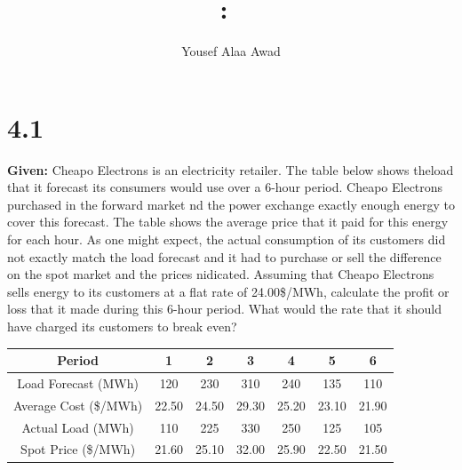\documentclass{article}
\title{
    \vspace{2in}
    \textmd{\textbf{\hmwkClass:\ \hmwkTitle}}\\
    \normalsize\vspace{0.1in}
    \vspace{3in}
}
\author{Yousef Alaa Awad}
\begin{document}
\maketitle
\pagebreak

\section{4.1}
\textbf{Given:} Cheapo Electrons is an electricity retailer. The table below shows theload that it forecast its consumers would use over a 6-hour period. Cheapo Electrons purchased in the forward market nd the power exchange exactly enough energy to cover this forecast. The table shows the average price that it paid for this energy for each hour. As one might expect, the actual consumption of its customers did not exactly match the load forecast and it had to purchase or sell the difference on the spot market and the prices nidicated. Assuming that Cheapo Electrons sells energy to its customers at a flat rate of 24.00\$/MWh, calculate the profit or loss that it made during this 6-hour period. What would the rate that it should have charged its customers to break even?
\begin{center}
	\begin{tabular}{||c|c|c|c|c|c|c||}
		\hline
		Period                & 1     & 2     & 3       & 4     & 5     & 6     \\
		\hline \hline
		Load Forecast (MWh)   & 120   & 230   & 310     & 240   & 135   & 110   \\
		\hline
		Average Cost (\$/MWh) & 22.50 & 24.50 & 29.30   & 25.20 & 23.10 & 21.90 \\
		\hline
		Actual Load (MWh)     & 110   & 225   & 330     & 250   & 125   & 105   \\
		\hline
		Spot Price (\$/MWh)   & 21.60 & 25.10 & 32.00   & 25.90 & 22.50 & 21.50 \\
		\hline
	\end{tabular}
\end{center}
\end{document}
